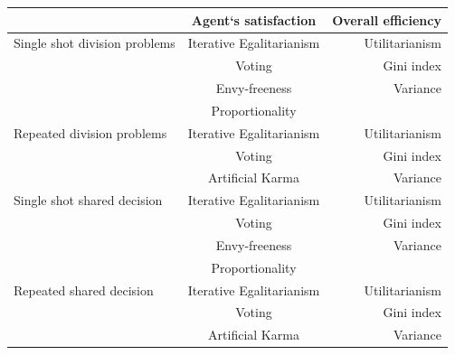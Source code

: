 \documentclass[german, a4paper, 11pt, oneside]{scrbook}
\begin{document}
\begin{center}
\begin{tabular}[h]{l|c|r}
 & Agent`s satisfaction & Overall efficiency \\
\hline
Single shot division problems & Iterative Egalitarianism & Utilitarianism \\
 & Voting & Gini index \\
 & Envy-freeness & Variance \\
 & Proportionality \\
\hline
Repeated division problems & Iterative Egalitarianism & Utilitarianism \\
 & Voting & Gini index \\
 & Artificial Karma & Variance \\
\hline
Single shot shared decision & Iterative Egalitarianism & Utilitarianism \\
 & Voting & Gini index \\
 & Envy-freeness & Variance \\
 & Proportionality & \\
\hline
Repeated shared decision & Iterative Egalitarianism & Utilitarianism \\
 & Voting & Gini index \\
 & Artificial Karma & Variance \\
\end{tabular}
\end{center}
\end{document}
